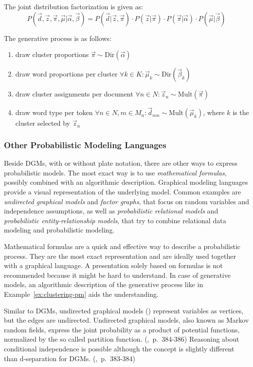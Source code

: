 \begin{Example}
The joint distribution factorization is given as:
\[P(\vec d, \vec z, \vec \pi, \vec \mu | \vec \alpha, \vec \beta) = P(\vec d | \vec z, \vec \pi) \cdot P(\vec z | \vec \pi) \cdot P(\vec \pi | \vec \alpha) \cdot P(\vec \mu | \vec \beta)\]

The generative process is as follows:
\begin{enumerate}
\item draw cluster proportions $\vec \pi \sim \text{Dir}(\vec \alpha)$
\item draw word proportions per cluster $\forall k \in K: \vec \mu_k \sim \text{Dir}(\vec \beta_k)$
\item draw cluster assignments per document $\forall n \in N: \vec z_n \sim \text{Mult}(\vec \pi)$
\item draw word type per token $\forall n \in N, m \in M_n: \vec d_{nm} \sim \text{Mult}(\vec \mu_k)$, where $k$ is the cluster selected by $\vec z_n$
\end{enumerate}

\end{Example}

\subsubsection{Other Probabilistic Modeling Languages}

Beside DGMs, with or without plate notation, there are other ways to express probabilistic models. The most exact way is to use \emph{mathematical formulas}, possibly combined with an algorithmic description. Graphical modeling languages provide a visual representation of the underlying model. Common examples are \emph{undirected graphical models} and \emph{factor graphs}, that focus on random variables and independence assumptions, as well as \emph{probabilistic relational models} and \emph{probabilistic entity-relationship models}, that try to combine relational data modeling and probabilistic modeling.

Mathematical formulas are a quick and effective way to describe a probabilistic process. They are the most exact representation and are ideally used together with a graphical language. A presentation solely based on formulas is not recommended because it might be hard to understand. In case of generative models, an algorithmic description of the generative process like in Example~\ref{ex:clustering-pm} aids the understanding. 

Similar to DGMs, undirected graphical models (\cite{kindermann1980markov}) represent variables as vertices, but the edges are undirected. Undirected graphical models, also known as Markov random fields, express the joint probability as a product of potential functions, normalized by the so called partition function. (\cite{bishop2006pattern},~p.~384-386) Reasoning about conditional independence is possible although the concept is slightly different than d-separation for DGMs. (\cite{bishop2006pattern},~p.~383-384)

